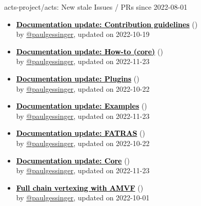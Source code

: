 \begin{frame}[allowframebreaks]{ acts-project/acts: New stale Issues / PRs since 2022-08-01 }
\begin{itemize}
    \item\iss\prstale\textbf{\href{https://github.com/acts-project/acts/issues/1423}{\textcolor{black}{Documentation update: Contribution guidelines}}}
    (\href{https://github.com/acts-project/acts/issues/1423}{}) \\
    by \href{https://github.com/paulgessinger}{@paulgessinger}, updated on 2022-10-19

    \item\iss\prstale\textbf{\href{https://github.com/acts-project/acts/issues/1422}{\textcolor{black}{Documentation update: How-to (core)}}}
    (\href{https://github.com/acts-project/acts/issues/1422}{}) \\
    by \href{https://github.com/paulgessinger}{@paulgessinger}, updated on 2022-11-23

    \item\iss\prstale\textbf{\href{https://github.com/acts-project/acts/issues/1421}{\textcolor{black}{Documentation update: Plugins}}}
    (\href{https://github.com/acts-project/acts/issues/1421}{}) \\
    by \href{https://github.com/paulgessinger}{@paulgessinger}, updated on 2022-10-22

    \item\iss\prstale\textbf{\href{https://github.com/acts-project/acts/issues/1420}{\textcolor{black}{Documentation update: Examples}}}
    (\href{https://github.com/acts-project/acts/issues/1420}{}) \\
    by \href{https://github.com/paulgessinger}{@paulgessinger}, updated on 2022-11-23

    \item\iss\prstale\textbf{\href{https://github.com/acts-project/acts/issues/1419}{\textcolor{black}{Documentation update: FATRAS}}}
    (\href{https://github.com/acts-project/acts/issues/1419}{}) \\
    by \href{https://github.com/paulgessinger}{@paulgessinger}, updated on 2022-10-22

    \item\iss\prstale\textbf{\href{https://github.com/acts-project/acts/issues/1418}{\textcolor{black}{Documentation update: Core}}}
    (\href{https://github.com/acts-project/acts/issues/1418}{}) \\
    by \href{https://github.com/paulgessinger}{@paulgessinger}, updated on 2022-11-23

    \item\iss\prstale\textbf{\href{https://github.com/acts-project/acts/issues/1406}{\textcolor{black}{Full chain vertexing with AMVF}}}
    (\href{https://github.com/acts-project/acts/issues/1406}{}) \\
    by \href{https://github.com/paulgessinger}{@paulgessinger}, updated on 2022-10-01


\end{itemize}
\end{frame}
